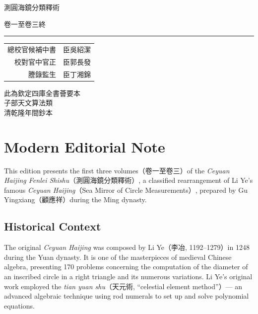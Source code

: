 \documentclass[11pt,a4paper]{article}
\newcommand{\shortline}{\noindent\rule{0.5\textwidth}{0.4pt}\par}
\newcounter{problem}[section]
\begin{document}
\thispagestyle{empty}
\begin{center}
\vspace*{3cm}
{\Large 測圓海鏡分類釋術}

\vspace{1cm}
{\large 卷一至卷三終}

\vspace{2cm}
\shortline

\vspace{1cm}
{\normalsize
\begin{tabular}{rl}
總校官候補中書 & 臣吳紹潔 \\
校對官中官正 & 臣郭長發 \\
謄錄監生 & 臣丁湘錦 \\
\end{tabular}
}

\vspace{2cm}
{\small\textcolor{notecolor}{%
此為欽定四庫全書薈要本\\
子部天文算法類\\
清乾隆年間鈔本
}}

\end{center}

\clearpage

\section*{Modern Editorial Note}

This edition presents the first three volumes（卷一至卷三）of the \textit{Ceyuan Haijing Fenlei Shishu}（測圓海鏡分類釋術）, a classified rearrangement of Li Ye's famous \textit{Ceyuan Haijing}（Sea Mirror of Circle Measurements）, prepared by Gu Yingxiang（顧應祥）during the Ming dynasty.

\subsection*{Historical Context}
The original \textit{Ceyuan Haijing} was composed by Li Ye（李冶, 1192--1279）in 1248 during the Yuan dynasty. It is one of the masterpieces of medieval Chinese algebra, presenting 170 problems concerning the computation of the diameter of an inscribed circle in a right triangle and its numerous variations. Li Ye's original work employed the \textit{tian yuan shu}（天元術, ``celestial element method''）--- an advanced algebraic technique using rod numerals to set up and solve polynomial equations.
\end{document}
